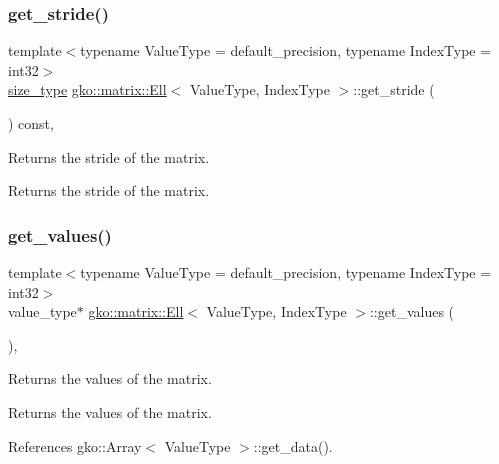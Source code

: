 \subsubsection{\texorpdfstring{get\+\_\+stride()}{get\_stride()}}
{\footnotesize\ttfamily template$<$typename Value\+Type = default\+\_\+precision, typename Index\+Type = int32$>$ \\
\hyperlink{namespacegko_a6e5c95df0ae4e47aab2f604a22d98ee7}{size\+\_\+type} \hyperlink{classgko_1_1matrix_1_1Ell}{gko\+::matrix\+::\+Ell}$<$ Value\+Type, Index\+Type $>$\+::get\+\_\+stride (\begin{DoxyParamCaption}{ }\end{DoxyParamCaption}) const\hspace{0.3cm}{\ttfamily [inline]}, {\ttfamily [noexcept]}}



Returns the stride of the matrix. 

\begin{DoxyReturn}{Returns}
the stride of the matrix. 
\end{DoxyReturn}
\mbox{\label{classgko_1_1matrix_1_1Ell_a4028e9629a7d96a7a483e6ea4a686a1d}} 
\subsubsection{\texorpdfstring{get\+\_\+values()}{get\_values()}}
{\footnotesize\ttfamily template$<$typename Value\+Type = default\+\_\+precision, typename Index\+Type = int32$>$ \\
value\+\_\+type$\ast$ \hyperlink{classgko_1_1matrix_1_1Ell}{gko\+::matrix\+::\+Ell}$<$ Value\+Type, Index\+Type $>$\+::get\+\_\+values (\begin{DoxyParamCaption}{ }\end{DoxyParamCaption})\hspace{0.3cm}{\ttfamily [inline]}, {\ttfamily [noexcept]}}



Returns the values of the matrix. 

\begin{DoxyReturn}{Returns}
the values of the matrix. 
\end{DoxyReturn}


References gko\+::\+Array$<$ Value\+Type $>$\+::get\+\_\+data().


